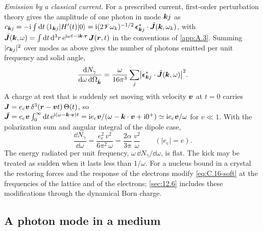 \emph{Emission by a classical current.} For a prescribed current, first-order perturbation theory gives the amplitude of one photon in mode $\bm{k}j$ as $c_{\bm{k}j} = -\mathrm{i}\int\mathrm{d} t\,\langle 1_{\bm{k}j}|H'(t)|0\rangle = \mathrm{i}(2\mathscr{V}\omega_k)^{-1/2}\,\boldsymbol{\epsilon}^*_{\bm{k}j}\cdot\tilde{\bm{J}}(\bm{k}, \omega_k)$, with $\tilde{\bm{J}}(\bm{k}, \omega) = \int\mathrm{d} t\,\mathrm{d}^3r\,\mathrm{e}^{\mathrm{i}\omega t - \mathrm{i}\bm{k}\cdot\bm{r}}\,\bm{J}(\bm{r}, t)$ in the conventions of \cref{app:A.3}. Summing $|c_{\bm{k}j}|^2$ over modes as above gives the number of photons emitted per unit frequency and solid angle,
\begin{equation}
  \frac{\mathrm{d} N_\gamma}{\mathrm{d}\omega\,\mathrm{d}\Omega_{\hat{\bm{k}}}} = \frac{\omega}{16\pi^3}\sum_j\bigl|\boldsymbol{\epsilon}^*_{\bm{k}j}\cdot\tilde{\bm{J}}(\bm{k}, \omega)\bigr|^2 .
  \label{eq:C.16-classical}
\end{equation}
A charge at rest that is suddenly set moving with velocity $\bm{v}$ at $t = 0$ carries $\bm{J} = e_{\mathrm{c}}\bm{v}\,\delta^3(\bm{r} - \bm{v}t)\,\Theta(t)$, so $\tilde{\bm{J}} = e_{\mathrm{c}}\bm{v}\int_0^\infty\mathrm{d} t\,\mathrm{e}^{\mathrm{i}(\omega - \bm{k}\cdot\bm{v})t} = \mathrm{i} e_{\mathrm{c}}\bm{v}/(\omega - \bm{k}\cdot\bm{v} + \mathrm{i}0^+) \simeq \mathrm{i} e_{\mathrm{c}}\bm{v}/\omega$ for $v \ll 1$. With the polarization sum and angular integral of the dipole case,
\begin{equation}
  \frac{\dd N_\gamma}{\dd\omega} = \frac{e_{\mathrm{c}}^2\,v^2}{6\pi^2\,\omega} = \frac{2\alpha}{3\pi}\,\frac{v^2}{\omega} \qquad (|e_{\mathrm{c}}| = e) .
  \label{eq:C.16-soft}
\end{equation}
The energy radiated per unit frequency, $\omega\,\dd N_\gamma/\dd\omega$, is flat. The kick may be treated as sudden when it lasts less than $1/\omega$. For a nucleus bound in a crystal the restoring forces and the response of the electrons modify \cref{eq:C.16-soft} at the frequencies of the lattice and of the electrons; \cref{sec:12.6} includes these modifications through the dynamical Born charge.

\subsection{A photon mode in a medium}

